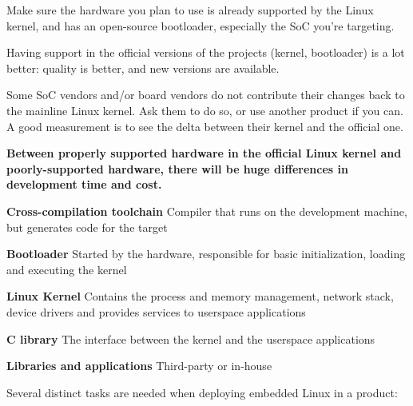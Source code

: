 \startitemize
\item Make sure the hardware you plan to use is already supported by
  the Linux kernel, and has an open-source bootloader, especially
  the SoC you’re targeting.
\item Having support in the official versions of the projects
  (kernel, bootloader) is a lot better: quality is better, and new
  versions are available.
\item Some SoC vendors and/or board vendors do not contribute their
  changes back to the mainline Linux kernel. Ask them to do so, or
  use another product if you can. A good measurement is to see the
  delta between their kernel and the official one.
\item {\bf Between properly supported hardware in the official Linux
  kernel and poorly-supported hardware, there will be huge
  differences in development time and cost.}
\stopitemize




  \startitemize
  \item {\bf Cross-compilation toolchain}
    Compiler that runs on the development machine, but generates
    code for the target
  \item {\bf Bootloader}
    Started by the hardware, responsible for basic
      initialization, loading and executing the kernel
  \item {\bf Linux Kernel}
    Contains the process and memory management, network stack,
      device drivers and provides services to userspace applications
  \item {\bf C library}
    The interface between the kernel and the userspace
      applications
  \item {\bf Libraries and applications}
     Third-party or in-house
  \stopitemize


  Several distinct tasks are needed when deploying embedded Linux in a
  product:

